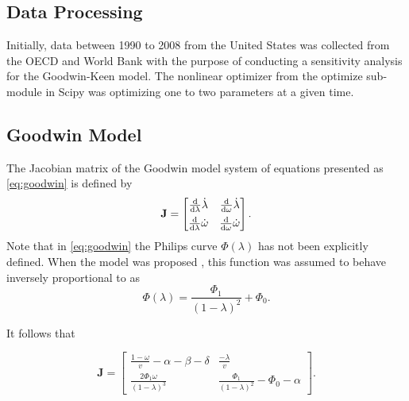 \documentclass[12pt, centerh1]{article}
\begin{document}
\subsection{Data Processing}
Initially, data between 1990 to 2008 from the United States was collected from the OECD and World Bank \citep{employmentrate, wageshare, debt} with the purpose of conducting a sensitivity analysis for the Goodwin-Keen model. The nonlinear optimizer from the optimize sub-module in Scipy \citep{scipy} was optimizing one to two parameters at a given time. 

\subsection{Goodwin Model}
The Jacobian matrix of the Goodwin model system of equations presented as \eqref{eq:goodwin} is defined by
\begin{equation*}
\mathbf J =
\begin{bmatrix}
    \dv{\lambda}\dot{\lambda} & \dv{\omega}\dot{\lambda}\\[1ex]
    \dv{\lambda}\dot{\omega} & \dv{\omega}\dot{\omega}
\end{bmatrix}.
\end{equation*}
Note that in \eqref{eq:goodwin} the Philips curve $\Phi(\lambda)$ has not been explicitly defined. When the model was proposed \citep{goodwin1982growth}, this function was assumed to behave inversely proportional to as 
\begin{equation*}
    \Phi(\lambda) =\frac{\Phi_1}{(1-\lambda)^2}+\Phi_0.
\end{equation*}

\noindent
It follows that

\begin{equation} \label{eq:jac_good}
    \mathbf J = \begin{bmatrix}
        \frac{1-\omega}{v}-\alpha-\beta-\delta & \frac{-\lambda}{v}\\[1ex]
        \frac{2\Phi_1\omega}{(1-\lambda)^3} & \frac{\Phi_1}{(1-\lambda)^2}-\Phi_0-\alpha
\end{bmatrix}.
\end{equation}
\end{document}
